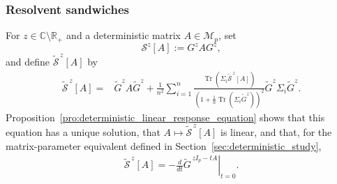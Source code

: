 \documentclass[EJP, preprint, NODS, nobera, nofontexpansion]{ejpecp}
\DeclareMathOperator{\tr}{Tr}
\DeclareMathOperator{\hs}{HS}
\begin{document}

\subsubsection{Resolvent sandwiches}
\label{sssec:main_resolvent_sandwiches}
For $z\in\mathbb C\setminus\mathbb R_+$ and a deterministic matrix $A\in\mathcal M_p$, set
\[
    \mathcal S^z[A]:=G^zAG^z,
\]
and define $\widetilde{\mathcal S}^{\,z}[A]$ by
\begin{align}
\label{eq:deterministic_linear_response_equation}
    \widetilde{\mathcal S}^{\,z}[A]
    ={}&
    \tilde G^z A\tilde G^z
    +
    \frac1{n^2}\sum_{i=1}^n
    \frac{
        \tr\!\left(
            \Sigma_i\widetilde{\mathcal S}^{\,z}[A]
        \right)
    }{
        \left(
            1+\frac1n\tr(\Sigma_i\tilde G^z)
        \right)^2
    }
    \tilde G^z\Sigma_i\tilde G^z.
\end{align}
Proposition~\ref{pro:deterministic_linear_response_equation} shows that
this equation has a unique solution, that
$A\mapsto\widetilde{\mathcal S}^{\,z}[A]$ is linear, and that, for the matrix-parameter equivalent defined in Section~\ref{sec:deterministic_study},
\begin{align*}
    \widetilde{\mathcal S}^{\,z}[A]
=-\left.\frac{d}{dt}\widetilde G^{\,zI_p-tA}\right|_{t=0}.
\end{align*}
\end{document}
